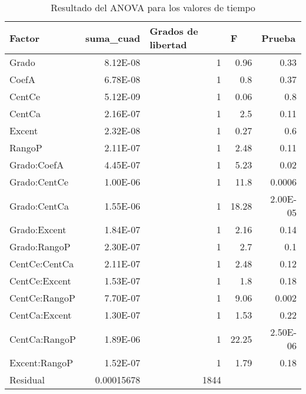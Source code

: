 \documentclass{article}
\begin{document}
\begin{table}
  \centering
  \caption{Resultado del ANOVA para los valores de tiempo}
    \begin{tabular}{|l|r|r|r|r|}
    \toprule
    \rowcolor[rgb]{ .357,  .608,  .835} \textbf{Factor} & \multicolumn{1}{l|}{\textbf{suma\_cuad}} & \multicolumn{1}{l|}{\textbf{Grados de libertad}} & \multicolumn{1}{l|}{\textbf{F}} & \multicolumn{1}{l|}{\textbf{Prueba}} \\
    \midrule
    Grado & 8.12E-08 & 1     & 0.96  & 0.33 \\
    \midrule
    CoefA & 6.78E-08 & 1     & 0.8   & 0.37 \\
    \midrule
    CentCe & 5.12E-09 & 1     & 0.06  & 0.8 \\
    \midrule
    CentCa & 2.16E-07 & 1     & 2.5   & 0.11 \\
    \midrule
    Excent & 2.32E-08 & 1     & 0.27  & 0.6 \\
    \midrule
    RangoP & 2.11E-07 & 1     & 2.48  & 0.11 \\
    \midrule
    Grado:CoefA & 4.45E-07 & 1     & 5.23  & 0.02 \\
    \midrule
    Grado:CentCe & 1.00E-06 & 1     & 11.8  & 0.0006 \\
    \midrule
    Grado:CentCa & 1.55E-06 & 1     & 18.28 & 2.00E-05 \\
    \midrule
    Grado:Excent & 1.84E-07 & 1     & 2.16  & 0.14 \\
    \midrule
    Grado:RangoP & 2.30E-07 & 1     & 2.7   & 0.1 \\
    \midrule
    CentCe:CentCa & 2.11E-07 & 1     & 2.48  & 0.12 \\
    \midrule
    CentCe:Excent & 1.53E-07 & 1     & 1.8   & 0.18 \\
    \midrule
    CentCe:RangoP & 7.70E-07 & 1     & 9.06  & 0.002 \\
    \midrule
    CentCa:Excent & 1.30E-07 & 1     & 1.53  & 0.22 \\
    \midrule
    CentCa:RangoP & 1.89E-06 & 1     & 22.25 & 2.50E-06 \\
    \midrule
    Excent:RangoP & 1.52E-07 & 1     & 1.79  & 0.18 \\
    \midrule
    Residual & 0.00015678 & 1844  &       &  \\
    \bottomrule
    \end{tabular}%
  \label{tab:Cuadro 1}%
\end{table}%
\end{document}
